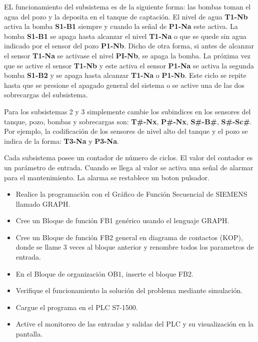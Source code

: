 EL funcionamiento del subsistema es de la siguiente forma: las bombas toman el agua del pozo y la deposita en el tanque de captación. El nivel de agua \textbf{T1-Nb} activa la bomba \textbf{S1-B1} siempre y cuando la señal de \textbf{P1-Na} este activa. La bomba \textbf{S1-B1}  se apaga hasta alcanzar el nivel \textbf{T1-Na}  o que se quede sin agua indicado por el sensor del pozo \textbf{P1-Nb}. Dicho de otra forma, si antes de alcanzar el sensor \textbf{T1-Na} se activase el nivel \textbf{PI-Nb}, se apaga la bomba. La próxima vez que se active el sensor \textbf{T1-Nb}  y este activa el sensor \textbf{P1-Na} se activa la segunda bomba \textbf{S1-B2} y se apaga hasta alcanzar \textbf{T1-Na} o \textbf{P1-Nb}.   Este ciclo se repite hasta que se presione el apagado general del sistema o se active una de las dos sobrecargas del subsistema.

Para los subsistemas 2 y 3 simplemente cambie los subindices en los sensores del tanque, pozo, bombas y sobrecargas son: \textbf{T\#-Nx}, \textbf{P\#-Nx}, \textbf{S\#-B\#}, \textbf{S\#-Sc\#}. Por ejemplo, la codificación de los sensores de nivel alto del tanque y el pozo se indica de la forma: \textbf{T3-Na} y \textbf{P3-Na}.

Cada subsistema posee un contador de número de ciclos. El valor del contador es un parámetro de entrada. Cuando se llega al valor se activa una señal de alarmar para el mantenimiento. La alarma se restablece un boton pulsador.

\begin{itemize}
	\item Realice la programación con el Gráfico de Función Secuencial de SIEMENS llamado GRAPH.
	\item Cree un Bloque de función FB1 genérico  usando el lenguaje GRAPH.
	\item Cree un Bloque de  función FB2 general en diagrama de contactos (KOP), donde se llame 3 veces al bloque anterior y  renombre todos los parametros de entrada.
	\item En el Bloque de organización OB1, inserte el bloque FB2.
	\item Verifique el funcionamiento  la solución del problema mediante simulación.
	\item Cargue el programa en el PLC S7-1500.
	\item Active el monitoreo de las entradas y salidas del PLC y su visualización en la pantalla. 
	
\end{itemize}

